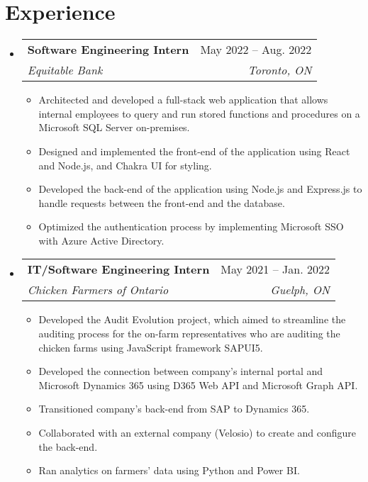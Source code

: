\documentclass[letterpaper,11pt]{article}
\makeatletter
\newcommand{\resumeItem}[1]{
  \item\small{
    {#1 \vspace{-2pt}}
  }
}
\newcommand{\resumeSubheading}[4]{
  \vspace{-2pt}\item
    \begin{tabular*}{0.97\textwidth}[t]{l@{\extracolsep{\fill}}r}
      \textbf{#1} & #2 \\
      \textit{\small#3} & \textit{\small #4} \\
    \end{tabular*}\vspace{-7pt}
}
\newcommand{\resumeSubSubheading}[2]{
    \item
    \begin{tabular*}{0.97\textwidth}{l@{\extracolsep{\fill}}r}
      \textit{\small#1} & \textit{\small #2} \\
    \end{tabular*}\vspace{-7pt}
}
\newcommand{\resumeSubHeadingListStart}{\begin{itemize}[leftmargin=0.15in, label={}]}
\newcommand{\resumeSubHeadingListEnd}{\end{itemize}}
\newcommand{\resumeItemListStart}{\begin{itemize}}
\newcommand{\resumeItemListEnd}{\end{itemize}\vspace{-5pt}}
\makeatother
\begin{document}
\section{Experience}
  \resumeSubHeadingListStart
    \resumeSubheading
      {Software Engineering Intern}{May 2022 -- Aug. 2022}
      {Equitable Bank}{Toronto, ON}
      \resumeItemListStart
        \resumeItem{Architected and developed a full-stack web application that allows internal employees to query and run stored functions and procedures on a Microsoft SQL Server on-premises.}
        \resumeItem{Designed and implemented the front-end of the application using React and Node.js, and Chakra UI for styling.}
        \resumeItem{Developed the back-end of the application using Node.js and Express.js to handle requests between the front-end and the database.}
        \resumeItem{Optimized the authentication process by implementing Microsoft SSO with Azure Active Directory.}
      \resumeItemListEnd
    \resumeSubheading
      {IT/Software Engineering Intern}{May 2021 -- Jan. 2022}
      {Chicken Farmers of Ontario}{Guelph, ON}
      \resumeItemListStart
        \resumeItem{Developed the Audit Evolution project, which aimed to streamline the auditing process for the on-farm representatives who are auditing the chicken farms using JavaScript framework SAPUI5.}
        \resumeItem{Developed the connection between company's internal portal and Microsoft Dynamics 365 using D365 Web API and Microsoft Graph API.}
        \resumeItem{Transitioned company's back-end from SAP to Dynamics 365.}
        \resumeItem{Collaborated with an external company (Velosio) to create and configure the back-end.}
        \resumeItem{Ran analytics on farmers' data using Python and Power BI.}
      \resumeItemListEnd
    
      

  \resumeSubHeadingListEnd


\end{document}
